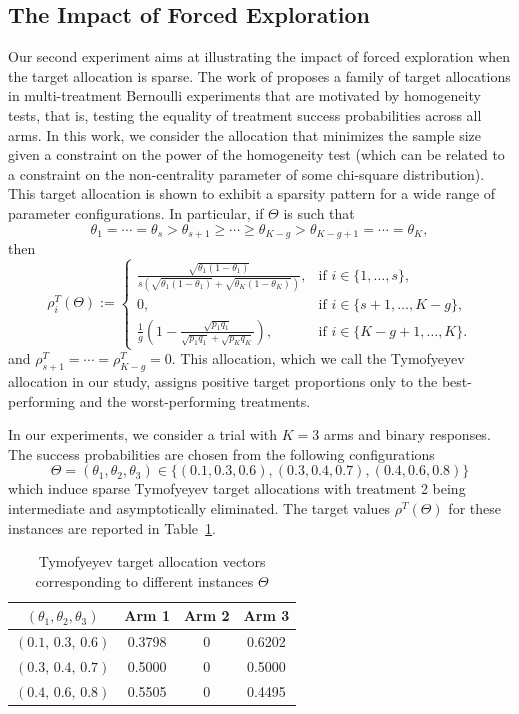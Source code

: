 \subsection{The Impact of Forced Exploration} Our second experiment aims at illustrating the impact of forced exploration when the target allocation is sparse.
The work of \cite{tymofyeyev2007implementing} proposes a family of target allocations in multi-treatment Bernoulli experiments that are motivated by homogeneity tests, that is, testing
the equality of treatment success probabilities across all arms. In this work, we consider the allocation that minimizes the sample size given a constraint on the power of the homogeneity test (which can be related to a constraint on the non-centrality parameter of some chi-square distribution). This target allocation is shown to exhibit a sparsity pattern for a wide range of parameter configurations. In particular, if $\Theta$ is such that
\[\theta_1=\cdots=\theta_s
>
\theta_{s+1}\geq\cdots\geq \theta_{K-g}
>
\theta_{K-g+1}=\cdots=\theta_K ,\]
then
\[
\rho_i^T(\Theta):=
\begin{cases}
	\displaystyle
	\frac{\sqrt{\theta_1 (1 - \theta_1)}}
	{s\left(\sqrt{\theta_1 (1 - \theta_1)}+\sqrt{\theta_K (1 - \theta_K)}\right)},
	& \text{if } i\in\{1,\dots,s\},
	\\[1.2em]
	0,
	& \text{if } i\in\{s+1,\dots,K-g\},
	\\[1.2em]
	\displaystyle
	\frac{1}{g}\left(
	1-
	\frac{\sqrt{p_1q_1}}
	{\sqrt{p_1q_1}+\sqrt{p_Kq_K}}
	\right),
	& \text{if } i\in\{K-g+1,\dots,K\}.
\end{cases}
\]
and \(\rho_{s+1}^T=\cdots=\rho_{K-g}^T=0\). This allocation, which we call the Tymofyeyev allocation in our study, assigns positive target proportions only to the best-performing and the worst-performing treatments. 


In our experiments, we consider a trial with $K=3$ arms and binary responses. The success probabilities are chosen from the following configurations
\[\Theta=(\theta_1,\theta_2,\theta_3) \in \{(0.1,0.3,0.6), (0.3,0.4,0.7), (0.4,0.6,0.8)\}\]
which induce sparse Tymofyeyev target allocations with treatment 2 being intermediate and asymptotically eliminated. The target values \(\rho^{T}\left(\Theta\right)\) for these instances are reported  in Table~\ref{tab:rho_tymo}.

\begin{table}[b]
	\centering
	\begin{tabular}{c|ccc}
		\hline
		$(\theta_1,\theta_2,\theta_3)$ & Arm 1 & Arm 2 & Arm 3 \\
		\hline
		$(0.1,\,0.3,\,0.6)$ & 0.3798 & 0 & 0.6202 \\
		$(0.3,\,0.4,\,0.7)$ & 0.5000 & 0 & 0.5000 \\
		$(0.4,\,0.6,\,0.8)$ & 0.5505 & 0 & 0.4495 \\
		\hline
	\end{tabular}
	\caption{\label{tab:rho_tymo}Tymofyeyev target allocation vectors corresponding to different instances $\Theta$}
\end{table}

